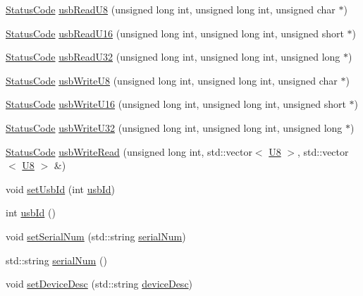 \begin{DoxyCompactItemize}
\item 
\hyperlink{classStatusCode}{Status\+Code} \hyperlink{classUsbFTInterface_ab0803dd4c3ce3bf26dff4f4145b34546}{usb\+Read\+U8} (unsigned long int, unsigned long int, unsigned char $\ast$)
\item 
\hyperlink{classStatusCode}{Status\+Code} \hyperlink{classUsbFTInterface_ae17381a2ca14b9acac9faa10c3e430db}{usb\+Read\+U16} (unsigned long int, unsigned long int, unsigned short $\ast$)
\item 
\hyperlink{classStatusCode}{Status\+Code} \hyperlink{classUsbFTInterface_a7eadb8a94323fada4c72ed1c992792cc}{usb\+Read\+U32} (unsigned long int, unsigned long int, unsigned long $\ast$)
\item 
\hyperlink{classStatusCode}{Status\+Code} \hyperlink{classUsbFTInterface_a8aeebce6a10aa88c19cfa663b47b389a}{usb\+Write\+U8} (unsigned long int, unsigned long int, unsigned char $\ast$)
\item 
\hyperlink{classStatusCode}{Status\+Code} \hyperlink{classUsbFTInterface_aa37ff87bb675d1671ee7a92ee83500b9}{usb\+Write\+U16} (unsigned long int, unsigned long int, unsigned short $\ast$)
\item 
\hyperlink{classStatusCode}{Status\+Code} \hyperlink{classUsbFTInterface_ac5eac42e444c9b0f19f0f70598c51b20}{usb\+Write\+U32} (unsigned long int, unsigned long int, unsigned long $\ast$)
\item 
\hyperlink{classStatusCode}{Status\+Code} \hyperlink{classUsbFTInterface_aa477927996bd05aeee185c192ef9a68e}{usb\+Write\+Read} (unsigned long int, std\+::vector$<$ \hyperlink{classUsbFTInterface_a3b007566f8af758984d97ada2b9938d3}{U8} $>$, std\+::vector$<$ \hyperlink{classUsbFTInterface_a3b007566f8af758984d97ada2b9938d3}{U8} $>$ \&)
\item 
void \hyperlink{classUsbFTInterface_a6718c98c2b6d5924b6722e81f93f25f0}{set\+Usb\+Id} (int \hyperlink{classUsbFTInterface_a2a63b462eb5831b4aef9d0f4c8d6ee1a}{usb\+Id})
\item 
int \hyperlink{classUsbFTInterface_a2a63b462eb5831b4aef9d0f4c8d6ee1a}{usb\+Id} ()
\item 
void \hyperlink{classUsbFTInterface_aaabe44c3b717a98e7571de296085c3a4}{set\+Serial\+Num} (std\+::string \hyperlink{classUsbFTInterface_ab4a2aa9664e903c57ae396faf643e7a3}{serial\+Num})
\item 
std\+::string \hyperlink{classUsbFTInterface_ab4a2aa9664e903c57ae396faf643e7a3}{serial\+Num} ()
\item 
void \hyperlink{classUsbFTInterface_abb106a3d2c48826f96ec2ac10d029132}{set\+Device\+Desc} (std\+::string \hyperlink{classUsbFTInterface_af353796fd68a869ea5c8e753aa65dc2c}{device\+Desc})

\end{DoxyCompactItemize}
